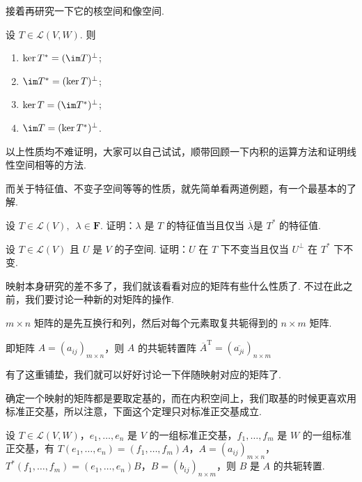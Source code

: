 接着再研究一下它的核空间和像空间.

设 $ T \in \mathcal{L}(V, W) $. 则

\begin{enumerate}
    \item $ \ker T^* = (\im T)^{\perp} $;

    \item $ \im T^* = (\ker T)^{\perp} $;

    \item $ \ker T = (\im T^*)^{\perp} $;

    \item $ \im T = (\ker T^*)^{\perp} $.
\end{enumerate}

以上性质均不难证明，大家可以自己试试，顺带回顾一下内积的运算方法和证明线性空间相等的方法.

而关于特征值、不变子空间等等的性质，就先简单看两道例题，有一个最基本的了解.

\begin{example} \label{ex:24:伴随与特征值}
    设 $ T \in \mathcal{L}(V),\enspace \lambda \in \mathbf{F} $. 证明：$ \lambda $ 是 $ T $ 的特征值当且仅当 $ \overline{\lambda} $是 $ T^* $ 的特征值.
\end{example}

\begin{example} \label{ex:24:伴随与不变子空间}
    设 $ T \in \mathcal{L}(V) $ 且 $ U $ 是 $ V $ 的子空间. 证明：$ U $ 在 $ T $ 下不变当且仅当 $ U^{\perp} $ 在 $ T^* $ 下不变.
\end{example}

映射本身研究的差不多了，我们就该看看对应的矩阵有些什么性质了. 不过在此之前，我们要讨论一种新的对矩阵的操作.

\begin{definition}[共轭转置] 
    $ m \times n $ 矩阵的是先互换行和列，然后对每个元素取复共轭得到的 $ n \times m $ 矩阵.

    即矩阵 $ A = (a_{ij})_{m \times n} $，则 $ A $ 的共轭转置阵 $ \overline{A}^{\mathrm{T}} = (\overline{a_{ji}})_{n \times m} $
\end{definition}

有了这重铺垫，我们就可以好好讨论一下伴随映射对应的矩阵了.

确定一个映射的矩阵都是要取定基的，而在内积空间上，我们取基的时候更喜欢用标准正交基，所以注意，下面这个定理只对标准正交基成立.

\begin{theorem}
    设 $ T \in \mathcal{L}(V, W) $，$ e_1, \ldots , e_n $ 是 $ V $ 的一组标准正交基，$ f_1, \ldots , f_m $ 是 $ W $ 的一组标准正交基，有 $ T(e_1, \ldots , e_n) = (f_1, \ldots , f_m)A $，$ A = (a_{ij})_{m \times n} $，$ T^*(f_1, \ldots , f_m) =(e_1, \ldots , e_n)B $，$ B = (b_{ij})_{n \times m} $，则 $ B $ 是 $ A $ 的共轭转置.
\end{theorem}


